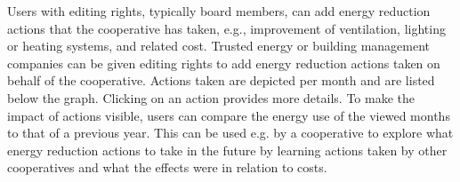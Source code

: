 %
Users with editing rights, typically board members, can  add energy reduction actions that the cooperative has taken, e.g., improvement of ventilation, lighting or heating systems, 
and related cost.
Trusted energy or building management companies can be given editing rights to add energy reduction actions taken on behalf of the cooperative. 
Actions taken are depicted per month and are listed below the graph. Clicking on an action provides more details.
% 
To make the impact of actions visible, users can compare the energy use of the viewed months to that of a previous year. This can be used e.g. by a cooperative to explore what energy reduction actions to take in the future by learning actions taken by other cooperatives and what the effects were in relation to costs.



